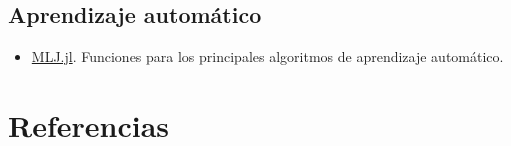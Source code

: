 \documentclass[
  letterpaper,
  DIV=11,
  numbers=noendperiod]{scrreprt}
\providecommand{\tightlist}{%
  \setlength{\itemsep}{0pt}\setlength{\parskip}{0pt}}\usepackage{longtable,booktabs,array}
\newlength{\cslhangindent}
\newlength{\cslentryspacingunit} %
\newenvironment{CSLReferences}[2] %
 {%
  \setlength{\parindent}{0pt}
  \ifodd #1
  \let\oldpar\par
  \def\par{\hangindent=\cslhangindent\oldpar}
  \fi
  \setlength{\parskip}{#2\cslentryspacingunit}
 }%
 {}
\begin{document}
\hypertarget{aprendizaje-automuxe1tico}{%
\section{Aprendizaje automático}\label{aprendizaje-automuxe1tico}}

\begin{itemize}
\tightlist
\item
  \href{https://github.com/alan-turing-institute/MLJ.jl}{MLJ.jl}.
  Funciones para los principales algoritmos de aprendizaje automático.
\end{itemize}


\hypertarget{referencias}{%
\chapter*{Referencias}\label{referencias}}

\hypertarget{refs}{}
\begin{CSLReferences}{0}{0}
\end{CSLReferences}
\end{document}
